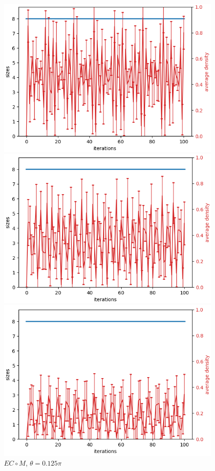 \documentclass[11pts,french]{article}
\begin{document}
\begin{figure}[h!]
\begin{minipage}{0.33\textwidth}
\centering
\includegraphics[width=\textwidth, height=0.66\textwidth]{sizes/0_erase_create_move}
\caption{$EC\circ M$, $\theta=0.375\pi$}
\end{minipage}
\begin{minipage}{0.33\textwidth}
\centering
\includegraphics[width=\textwidth, height=0.66\textwidth]{sizes/2_erase_create_move}
\caption{$EC\circ M$, $\theta=0.25\pi$}
\end{minipage}
\begin{minipage}{0.33\textwidth}
\centering
\includegraphics[width=\textwidth, height=0.66\textwidth]{sizes/1_erase_create_move}
\caption{$EC\circ M$, $\theta=0.125\pi$}
\end{minipage}


\end{figure}
\end{document}
